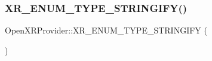 \subsubsection{\texorpdfstring{XR\_ENUM\_TYPE\_STRINGIFY()}{XR\_ENUM\_TYPE\_STRINGIFY()}\hspace{0.1cm}{\footnotesize\ttfamily [2/2]}}
{\footnotesize\ttfamily Open\+X\+R\+Provider\+::\+X\+R\+\_\+\+E\+N\+U\+M\+\_\+\+T\+Y\+P\+E\+\_\+\+S\+T\+R\+I\+N\+G\+I\+FY (\begin{DoxyParamCaption}\item[{Xr\+Session\+State}]{ }\end{DoxyParamCaption})}

